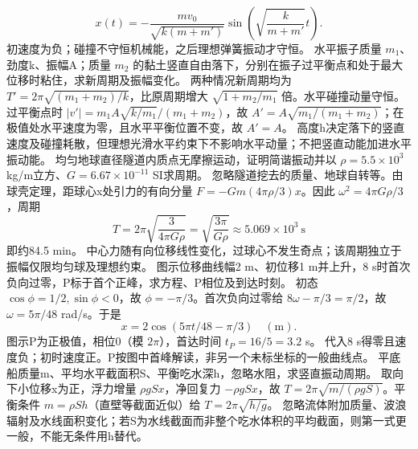 \[
x(t)=-\frac{mv_0}{\sqrt{k(m+m')}}\sin\!\left(\sqrt{\frac{k}{m+m'}}t\right).
\]
\crosscheck 初速度为负；碰撞不守恒机械能，之后理想弹簧振动才守恒。
\problemtext 水平振子质量 $m_1$、劲度k、振幅A；质量 $m_2$ 的黏土竖直自由落下，分别在振子过平衡点和处于最大位移时粘住，求新周期及振幅变化。
\workings 两种情况新周期均为 $T'=2\pi\sqrt{(m_1+m_2)/k}$，比原周期增大 $\sqrt{1+m_2/m_1}$ 倍。水平碰撞动量守恒。过平衡点时 $|v'|=m_1A\sqrt{k/m_1}/(m_1+m_2)$，故 $A'=A\sqrt{m_1/(m_1+m_2)}$；在极值处水平速度为零，且水平平衡位置不变，故 $A'=A$。
\crosscheck 高度h决定落下的竖直速度及碰撞耗散，但理想光滑水平约束下不影响水平动量；不把竖直动能加进水平振动能。
\problemtext 均匀地球直径隧道内质点无摩擦运动，证明简谐振动并以 $\rho=5.5\times10^3$ kg/m立方、$G=6.67\times10^{-11}$ SI求周期。
\workings 忽略隧道挖去的质量、地球自转等。由球壳定理，距球心x处引力的有向分量 $F=-Gm(4\pi\rho/3)x$。因此 $\omega^2=4\pi G\rho/3$，周期
\[
T=2\pi\sqrt{\frac{3}{4\pi G\rho}}=\sqrt{\frac{3\pi}{G\rho}}\approx5.069\times10^3\ \mathrm s
\]
即约84.5 min。
\crosscheck 中心力随有向位移线性变化，过球心不发生奇点；该周期独立于振幅仅限均匀球及理想约束。
\problemtext 图示位移曲线幅2 m、初位移1 m并上升，8 s时首次负向过零，P标于首个正峰，求方程、P相位及到达时刻。
\workings 初态 $\cos\phi=1/2,\sin\phi<0$，故 $\phi=-\pi/3$。首次负向过零给 $8\omega-\pi/3=\pi/2$，故 $\omega=5\pi/48$ rad/s。于是
\[
x=2\cos(5\pi t/48-\pi/3)\quad(\mathrm m).
\]
图示P为正极值，相位0（模 $2\pi$），首达时间 $t_P=16/5=3.2$ s。
\crosscheck 代入8 s得零且速度负；初时速度正。P按图中首峰解读，非另一个未标坐标的一般曲线点。
\problemtext 平底船质量m、平均水平截面积S、平衡吃水深h，忽略水阻，求竖直振动周期。
\workings 取向下小位移x为正，浮力增量 $\rho gSx$，净回复力 $-\rho gSx$，故 $T=2\pi\sqrt{m/(\rho gS)}$。平衡条件 $m=\rho Sh$（直壁等截面近似）给 $T=2\pi\sqrt{h/g}$。
\crosscheck 忽略流体附加质量、波浪辐射及水线面积变化；若S为水线截面而非整个吃水体积的平均截面，则第一式更一般，不能无条件用h替代。
